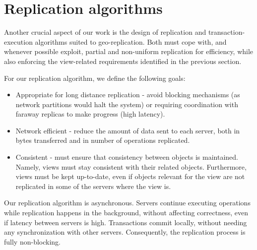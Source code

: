 \section{Replication algorithms}
\label{sec:replication_algorithm}

Another crucial aspect of our work is the design of replication and transaction-execution algorithms suited to geo-replication.
Both must cope with, and whenever possible exploit, partial and non-uniform replication for efficiency, while also enforcing the view-related requirements identified in the previous section.

For our replication algorithm, we define the following goals:
\begin{itemize}
	\item Appropriate for long distance replication - avoid blocking mechanisms (as network partitions would halt the system) or requiring coordination with faraway replicas to make progress (high latency).
	\item Network efficient - reduce the amount of data sent to each server, both in bytes transferred and in number of operations replicated.
	\item Consistent - must ensure that consistency between objects is maintained. Namely, views must stay consistent with their related objects.
	Furthermore, views must be kept up-to-date, even if objects relevant for the view are not replicated in some of the servers where the view is.
\end{itemize}

Our replication algorithm is asynchronous.
Servers continue executing operations while replication happens in the background, without affecting correctness, even if latency between servers is high.
Transactions commit locally, without needing any synchronization with other servers.
Consequently, the replication process is fully non-blocking.

